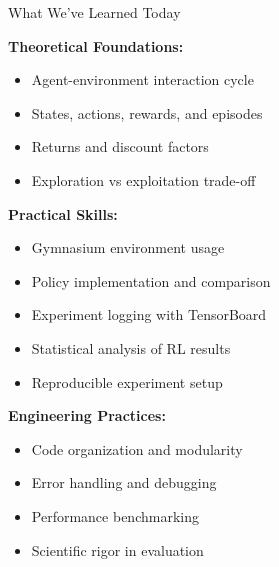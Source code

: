 \documentclass[aspectratio=169,10pt]{beamer}
\begin{document}
\begin{frame}{What We've Learned Today}

\textbf{Theoretical Foundations:}
\begin{itemize}
    \item Agent-environment interaction cycle
    \item States, actions, rewards, and episodes
    \item Returns and discount factors
    \item Exploration vs exploitation trade-off
\end{itemize}

\vfill

\textbf{Practical Skills:}
\begin{itemize}
    \item Gymnasium environment usage
    \item Policy implementation and comparison
    \item Experiment logging with TensorBoard
    \item Statistical analysis of RL results
    \item Reproducible experiment setup
\end{itemize}

\vfill

\textbf{Engineering Practices:}
\begin{itemize}
    \item Code organization and modularity
    \item Error handling and debugging
    \item Performance benchmarking
    \item Scientific rigor in evaluation
\end{itemize}

\end{frame}
\end{document}
